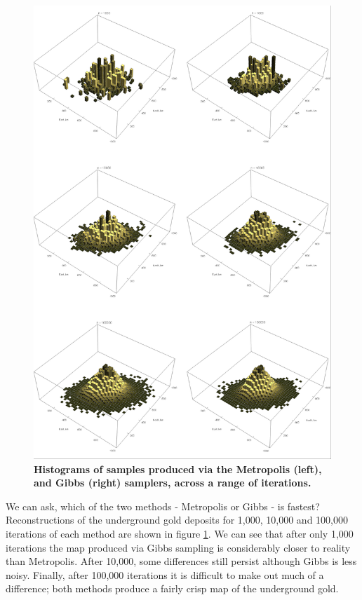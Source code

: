 \documentclass[11pt,fullpage]{book}
\begin{document}
\begin{figure}
\centerline{\includegraphics[width=1\textwidth]{Gibbs_goldMiningAgain3.png}}
\caption{\textbf{Histograms of samples produced via the Metropolis (left), and Gibbs (right) samplers, across a range of iterations.}}\label{fig:Gibbs_goldMiningAgain3}
\end{figure}

We can ask, which of the two methods - Metropolis or Gibbs - is fastest? Reconstructions of the underground gold deposits for 1,000, 10,000 and 100,000 iterations of each method are shown in figure \ref{fig:Gibbs_goldMiningAgain3}. We can see that after only 1,000 iterations the map produced via Gibbs sampling is considerably closer to reality than Metropolis. After 10,000, some differences still persist although Gibbs is less noisy. Finally, after 100,000 iterations it is difficult to make out much of a difference; both methods produce a fairly crisp map of the underground gold. 
\end{document}
